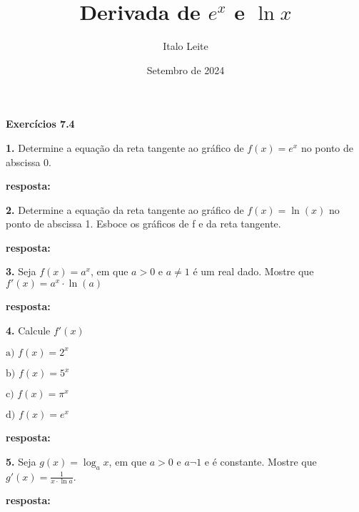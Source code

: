 \documentclass[article,12pt,oneside,a4paper,brazil]{abntex2}
\title{Derivada de $e^x$ e $\ln{x}$}
\author{Italo Leite}
\date{Setembro de 2024}
\begin{document}
	
	
	
	\begin{flushleft}
		\textbf{Exercícios 7.4}
		
		\textbf{1.} Determine a equação da reta tangente ao gráfico de $f(x) = e^x$ no ponto de abscissa 0.
		
		\textbf{resposta:}
		
		
		\vspace{1em}
		
		\textbf{2.} Determine a equação da reta tangente ao gráfico de $f(x) = \ln(x)$ no ponto de abscissa 1. Esboce os gráficos de f e da reta tangente.
		
		\textbf{resposta:}
		
		
		\vspace{1em}
		
		\textbf{3.} Seja $f(x) = a^x$, em que $a > 0$ e $a \neq 1$ é um real dado. Mostre que $f'(x)
		= a^x \cdot \ln(a)$	
		
		\textbf{resposta:}
		
		
		\vspace{1em}
		
		\textbf{4.} Calcule $f'(x)$	
			
		\begin{adjustwidth}{0.5cm}{0cm}
			$\text{a) } f(x) = 2^x$
			
			$\text{b) } f(x) = 5^x$
		
			$\text{c) } f(x) = \pi^x$
			
			$\text{d) } f(x) = e^x$
		\end{adjustwidth}	
			
		\textbf{resposta:}
		
		
		\vspace{1em}
		
		\textbf{5.} Seja $g(x)=\log_{a}{x}$, em que $a > 0$ e $a \neg 1$ e é constante. Mostre que $g'(x)=\frac{1}{x \cdot \ln{a}}$.
		
		\textbf{resposta:}
		
		

\end{flushleft}
\end{document}
